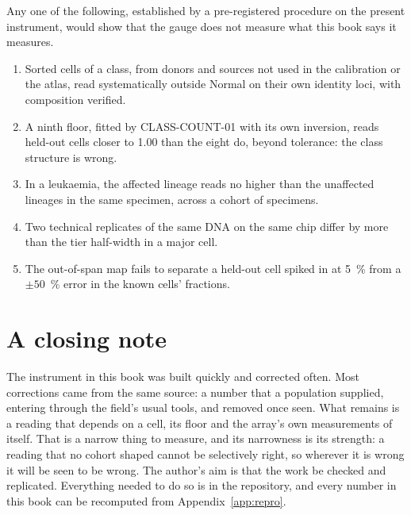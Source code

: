 \begin{keybox}[title=Falsifiers]
Any one of the following, established by a pre-registered procedure on the present instrument, would show that the gauge does not measure what this book says it measures.
\begin{enumerate}
\item Sorted cells of a class, from donors and sources not used in the calibration or the atlas, read systematically outside Normal on their own identity loci, with composition
      verified.
\item A ninth floor, fitted by CLASS-COUNT-01 with its own inversion, reads held-out cells closer to 1.00 than the eight do, beyond tolerance: the class structure is wrong.
\item In a leukaemia, the affected lineage reads no higher than the unaffected lineages in the same specimen, across a cohort of specimens.
\item Two technical replicates of the same DNA on the same chip differ by more than the tier half-width in a major cell.
\item The out-of-span map fails to separate a held-out cell spiked in at 5~\% from a $\pm50$~\% error in the known cells' fractions.
\end{enumerate}
\end{keybox}

\section{A closing note}

The instrument in this book was built quickly and corrected often. Most corrections came from the same source: a number that a population supplied, entering through the field's usual
tools, and removed once seen. What remains is a reading that depends on a cell, its floor and the array's own measurements of itself. That is a narrow thing to measure, and its
narrowness is its strength: a reading that no cohort shaped cannot be selectively right, so wherever it is wrong it will be seen to be wrong. The author's aim is that the work be
checked and replicated. Everything needed to do so is in the repository, and every number in this book can be recomputed from Appendix~\ref{app:repro}.
